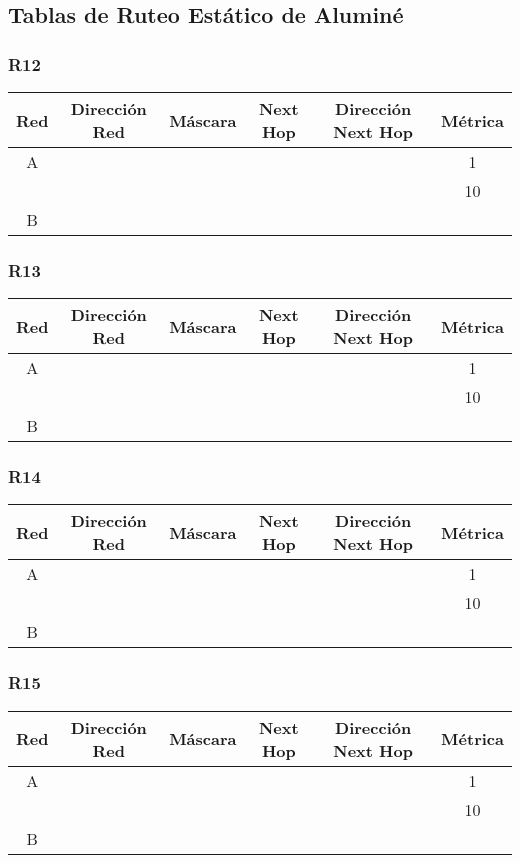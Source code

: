 \documentclass[12pt, a4paper, spanish]{article}
\begin{document}
\subsection{Tablas de Ruteo Estático de Aluminé}
\subsubsection{R12}
\begin{center}
\begin{tabular}{|c|c|c|c|c|c|}
	\hline
	Red & Dirección Red & Máscara & Next Hop & Dirección Next Hop & Métrica \\
	\hline
	\hline
	A &  &  &  &  & 1\\
 	  &  &  &  &  & 10 \\
	\hline	
	B & & & & &\\
	\hline
\end{tabular}
\end{center}

\subsubsection{R13}
\begin{center}
\begin{tabular}{|c|c|c|c|c|c|}
	\hline
	Red & Dirección Red & Máscara & Next Hop & Dirección Next Hop & Métrica \\
	\hline
	\hline
	A &  &  &  &  & 1\\
 	  &  &  &  &  & 10 \\
	\hline	
	B & & & & &\\
	\hline
\end{tabular}
\end{center}

\subsubsection{R14}
\begin{center}
\begin{tabular}{|c|c|c|c|c|c|}
	\hline
	Red & Dirección Red & Máscara & Next Hop & Dirección Next Hop & Métrica \\
	\hline
	\hline
	A &  &  &  &  & 1\\
 	  &  &  &  &  & 10 \\
	\hline	
	B & & & & &\\
	\hline
\end{tabular}
\end{center}

\subsubsection{R15}
\begin{center}
\begin{tabular}{|c|c|c|c|c|c|}
	\hline
	Red & Dirección Red & Máscara & Next Hop & Dirección Next Hop & Métrica \\
	\hline
	\hline
	A &  &  &  &  & 1\\
 	  &  &  &  &  & 10 \\
	\hline	
	B & & & & &\\
	\hline
\end{tabular}
\end{center}
\end{document}
